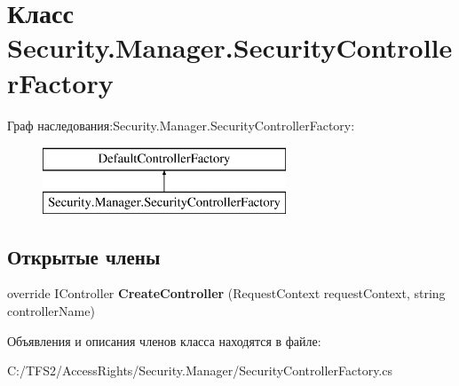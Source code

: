 \hypertarget{class_security_1_1_manager_1_1_security_controller_factory}{}\section{Класс Security.\+Manager.\+Security\+Controller\+Factory}
\label{class_security_1_1_manager_1_1_security_controller_factory}
Граф наследования\+:Security.\+Manager.\+Security\+Controller\+Factory\+:\begin{figure}[H]
\begin{center}
\leavevmode
\includegraphics[height=2.000000cm]{da/db9/class_security_1_1_manager_1_1_security_controller_factory}
\end{center}
\end{figure}
\subsection*{Открытые члены}
\begin{DoxyCompactItemize}
\item 
\mbox{\label{class_security_1_1_manager_1_1_security_controller_factory_a38c773b8e774837157ea2fc4df33a3bf}} 
override I\+Controller {\bfseries Create\+Controller} (Request\+Context request\+Context, string controller\+Name)
\end{DoxyCompactItemize}


Объявления и описания членов класса находятся в файле\+:\begin{DoxyCompactItemize}
\item 
C\+:/\+T\+F\+S2/\+Access\+Rights/\+Security.\+Manager/Security\+Controller\+Factory.\+cs\end{DoxyCompactItemize}
